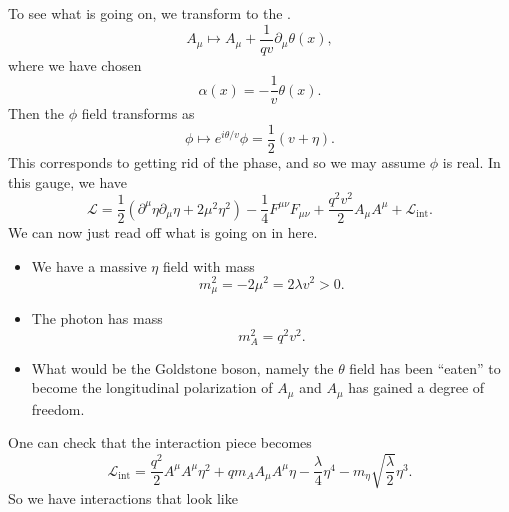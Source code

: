 \documentclass[a4paper]{article}
\begin{document}
To see what is going on, we transform to the .
\[
  A_\mu \mapsto A_\mu + \frac{1}{qv} \partial_\mu \theta(x),
\]
where we have chosen
\[
  \alpha(x) = - \frac{1}{v} \theta(x).
\]
Then the $\phi$ field transforms as
\[
  \phi \mapsto e^{i\theta/v} \phi = \frac{1}{2} (v + \eta).
\]
This corresponds to getting rid of the phase, and so we may assume $\phi$ is real. In this gauge, we have
\[
  \mathcal{L} = \frac{1}{2}(\partial^\mu \eta \partial_\mu \eta + 2 \mu^2 \eta^2) - \frac{1}{4} F^{\mu\nu}F_{\mu\nu} + \frac{q^2 v^2}{2} A_\mu A^\mu + \mathcal{L}_{\mathrm{int}}.
\]
We can now just read off what is going on in here.
\begin{itemize}
  \item We have a massive $\eta$ field with mass
    \[
      m_\mu^2 = - 2 \mu^2 = 2 \lambda v^2 > 0.
    \]
  \item The photon has mass
    \[
      m_A^2 = q^2 v^2.
    \]
  \item What would be the Goldstone boson, namely the $\theta$ field has been ``eaten'' to become the longitudinal polarization of $A_\mu$ and $A_\mu$ has gained a degree of freedom.
\end{itemize}
One can check that the interaction piece becomes
\[
  \mathcal{L}_{\mathrm{int}} = \frac{q^2}{2} A^\mu A^\mu \eta^2 + q m_A A_\mu A^\mu \eta - \frac{\lambda}{4} \eta^4 - m_\eta \sqrt{\frac{\lambda}{2}} \eta^3.
\]
So we have interactions that look like
\end{document}
